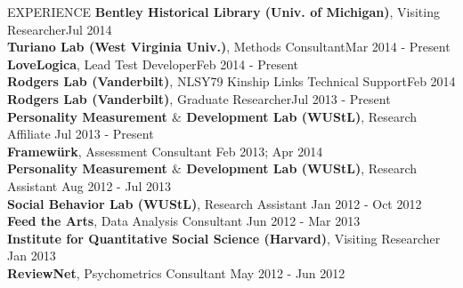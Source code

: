 \documentclass {resume}
\begin{document}
\begin{rSection}{\textrm{EXPERIENCE}}
\textbf{Bentley Historical Library (Univ. of Michigan)}, Visiting Researcher\hfill Jul 2014\smallskip\\
\textbf{Turiano Lab (West Virginia Univ.)}, Methods Consultant\hfill Mar 2014 - Present\smallskip\\%
\textbf{LoveLogica}, Lead Test Developer\hfill Feb 2014 - Present\smallskip\\
\textbf{Rodgers Lab (Vanderbilt)}, NLSY79 Kinship Links Technical Support\hfill Feb 2014%
\smallskip\\
\textbf{Rodgers Lab (Vanderbilt)}, Graduate Researcher\hfill Jul 2013 - Present\smallskip\\
\textbf{Personality Measurement $\&$ Development Lab (WUStL)}, Research Affiliate \hfill Jul 2013 - Present%
\smallskip\\
{\bf Framew\"{u}rk}, Assessment Consultant \hfill Feb 2013; Apr 2014\smallskip\\
\textbf{Personality Measurement $\&$ Development Lab (WUStL)}, Research Assistant \hfill Aug 2012 - Jul 2013\smallskip\\
\textbf{Social Behavior Lab (WUStL)}, Research Assistant \hfill Jan 2012 - Oct 2012\smallskip\\
{\bf Feed the Arts}, Data Analysis Consultant \hfill Jun 2012 - Mar 2013\smallskip\\
{\bf Institute for Quantitative Social Science (Harvard)}, Visiting Researcher  \hfill Jan 2013\smallskip\\
{\bf ReviewNet}, Psychometrics Consultant \hfill May 2012 - Jun 2012%
\end{rSection}
\end{document}
